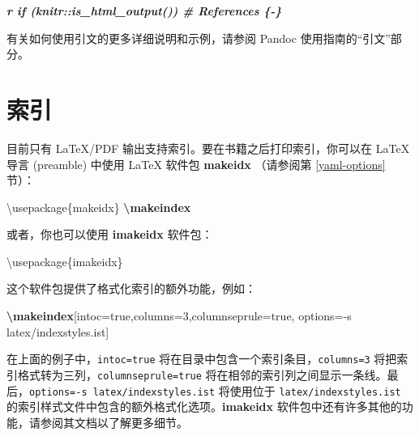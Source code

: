 \documentclass[
  12pt,
]{krantz}
\newenvironment{Shaded}{\begin{snugshade}}{\end{snugshade}}
\newcommand{\BuiltInTok}[1]{#1}
\newcommand{\ExtensionTok}[1]{#1}
\newcommand{\FunctionTok}[1]{\textcolor[rgb]{0.13,0.29,0.53}{\textbf{#1}}}
\newcommand{\InformationTok}[1]{\textcolor[rgb]{0.56,0.35,0.01}{\textbf{\textit{#1}}}}
\newcommand{\NormalTok}[1]{#1}
\theoremstyle{definition}
\theoremstyle{definition}
\theoremstyle{definition}
\theoremstyle{definition}
\theoremstyle{remark}
\begin{document}
\begin{Shaded}
\begin{Highlighting}[]
\InformationTok{\textasciigrave{}r if (knitr::is\_html\_output()) \textquotesingle{}\# References \{{-}\}\textquotesingle{}\textasciigrave{}}
\end{Highlighting}
\end{Shaded}

有关如何使用引文的更多详细说明和示例，请参阅 Pandoc 使用指南的``引文''部分。

\section{索引}\label{latex-index}

目前只有 LaTeX/PDF 输出支持索引。要在书籍之后打印索引，你可以在 LaTeX 导言 (preamble) 中使用 LaTeX 软件包 \textbf{makeidx} （请参阅第 \ref{yaml-options} 节）：

\begin{Shaded}
\begin{Highlighting}[]
\BuiltInTok{\textbackslash{}usepackage}\NormalTok{\{}\ExtensionTok{makeidx}\NormalTok{\}}
\FunctionTok{\textbackslash{}makeindex}
\end{Highlighting}
\end{Shaded}

或者，你也可以使用 \textbf{imakeidx} 软件包：

\begin{Shaded}
\begin{Highlighting}[]
\BuiltInTok{\textbackslash{}usepackage}\NormalTok{\{}\ExtensionTok{imakeidx}\NormalTok{\}}
\end{Highlighting}
\end{Shaded}

这个软件包提供了格式化索引的额外功能，例如：

\begin{Shaded}
\begin{Highlighting}[]
\FunctionTok{\textbackslash{}makeindex}\NormalTok{[intoc=true,columns=3,columnseprule=true,}
\NormalTok{           options={-}s latex/indexstyles.ist]}
\end{Highlighting}
\end{Shaded}

在上面的例子中，\texttt{intoc=true} 将在目录中包含一个索引条目，\texttt{columns=3} 将把索引格式转为三列，\texttt{columnseprule=true} 将在相邻的索引列之间显示一条线。最后，\texttt{options=-s\ latex/indexstyles.ist} 将使用位于 \texttt{latex/indexstyles.ist} 的索引样式文件中包含的额外格式化选项。\textbf{imakeidx} 软件包中还有许多其他的功能，请参阅其文档以了解更多细节。
\end{document}
